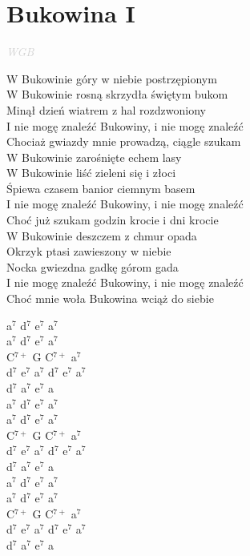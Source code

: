 \documentclass[a5paper, 10pt]{book}
\begin{document}
\section{Bukowina I}\textcolor{lightgray}{\textit{WGB}}\vspace*{1.5mm}\\
\begin{minipage}[t]{0.7\textwidth}
  W Bukowinie góry w niebie postrzępionym			\\
  W Bukowinie rosną skrzydła świętym bukom		\\
  Minął dzień wiatrem z hal rozdzwoniony			\\
  I nie mogę znaleźć Bukowiny, i nie mogę znaleźć\\
  Chociaż gwiazdy mnie prowadzą, ciągle szukam \vspace*{1.5mm}		\\
  W Bukowinie zarośnięte echem lasy\\
  W Bukowinie liść zieleni się i złoci\\
  Śpiewa czasem banior ciemnym basem\\
  I nie mogę znaleźć Bukowiny, i nie mogę znaleźć\\
  Choć już szukam godzin krocie i dni krocie\vspace*{1.5mm}\\
  W Bukowinie deszczem z chmur opada\\
  Okrzyk ptasi zawieszony w niebie\\
  Nocka gwiezdna gadkę górom gada\\
  I nie mogę znaleźć Bukowiny, i nie mogę znaleźć\\
  Choć mnie woła Bukowina wciąż do siebie\\
\end{minipage}
\begin{minipage}[t]{0.3\textwidth}
  a$^7$ d$^7$ e$^7$ a$^7$\\
  a$^7$ d$^7$ e$^7$ a$^7$\\
  C$^{7+}$ G C$^{7+}$ a$^7$\\
  d$^7$ e$^7$ a$^7$ d$^7$ e$^7$ a$^7$\\
  d$^7$ a$^7$ e$^7$ a \vspace*{1.5mm}\\
  a$^7$ d$^7$ e$^7$ a$^7$\\
  a$^7$ d$^7$ e$^7$ a$^7$\\
  C$^{7+}$ G C$^{7+}$ a$^7$\\
  d$^7$ e$^7$ a$^7$ d$^7$ e$^7$ a$^7$\\
  d$^7$ a$^7$ e$^7$ a \vspace*{1.5mm}\\
  a$^7$ d$^7$ e$^7$ a$^7$\\
  a$^7$ d$^7$ e$^7$ a$^7$\\
  C$^{7+}$ G C$^{7+}$ a$^7$\\
  d$^7$ e$^7$ a$^7$ d$^7$ e$^7$ a$^7$\\
  d$^7$ a$^7$ e$^7$ a \vspace*{1.5mm}\\
\end{minipage}
\end{document}
